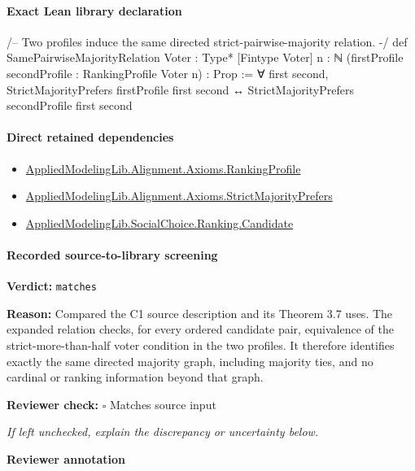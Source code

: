 \documentclass[10pt]{article}
\newcommand{\reviewerbox}{%
  \par\noindent\fbox{\parbox{0.96\linewidth}{\rule{0pt}{0.38in}}}\par
}
\newcommand{\reviewmatch}[1]{%
  \par\noindent\textbf{Reviewer check:} $\square$\; #1\par
  \noindent\emph{If left unchecked, explain the discrepancy or uncertainty below.}\par
}
\begin{document}
\paragraph{Exact Lean library declaration}
\begin{ReviewVerbatim}
/-- Two profiles induce the same directed strict-pairwise-majority relation. -/
def SamePairwiseMajorityRelation {Voter : Type*} [Fintype Voter] {n : ℕ}
    (firstProfile secondProfile : RankingProfile Voter n) : Prop :=
  ∀ first second,
    StrictMajorityPrefers firstProfile first second ↔
      StrictMajorityPrefers secondProfile first second
\end{ReviewVerbatim}

\paragraph{Direct retained dependencies}
\begin{itemize}\raggedright
\item \hyperlink{library-prerequisite-9bded048a60dfe0a}{Applied\allowbreak{}Modeling\allowbreak{}Lib.\allowbreak{}Alignment.\allowbreak{}Axioms.\allowbreak{}Ranking\allowbreak{}Profile}
\item \hyperlink{governing-declaration-a094f6e94e1e1408}{Applied\allowbreak{}Modeling\allowbreak{}Lib.\allowbreak{}Alignment.\allowbreak{}Axioms.\allowbreak{}Strict\allowbreak{}Majority\allowbreak{}Prefers}
\item \hyperlink{library-prerequisite-8c0e6c25845ae78a}{Applied\allowbreak{}Modeling\allowbreak{}Lib.\allowbreak{}Social\allowbreak{}Choice.\allowbreak{}Ranking.\allowbreak{}Candidate}
\end{itemize}
\paragraph{Recorded source-to-library screening}
\textbf{Verdict:} \texttt{matches}
\\
{\raggedright
\textbf{Reason:} Compared the C1 source description and its Theorem 3.\allowbreak{}7 uses.\allowbreak{} The expanded relation checks, for every ordered candidate pair, equivalence of the strict-\allowbreak{}more-\allowbreak{}than-\allowbreak{}half voter condition in the two profiles.\allowbreak{} It therefore identifies exactly the same directed majority graph, including majority ties, and no cardinal or ranking information beyond that graph.\allowbreak{}
\par}
\reviewmatch{Matches source input}
\noindent\textbf{Reviewer annotation}\par
\reviewerbox
\clearpage
\hypertarget{library-prerequisite-e72857a369826fa4}{}
\end{document}
